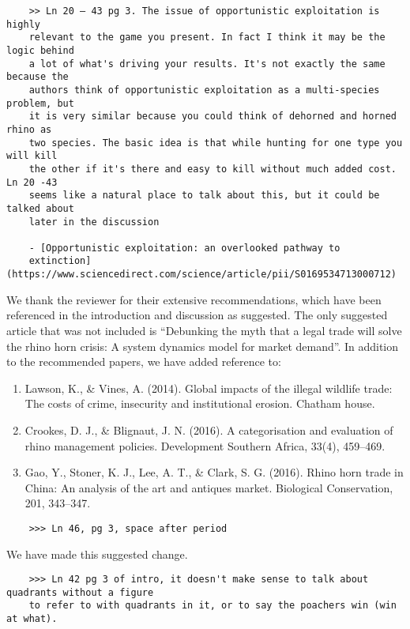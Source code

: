 \documentclass[10pt]{article}
\begin{document}
\begin{verbatim}
    >> Ln 20 – 43 pg 3. The issue of opportunistic exploitation is highly
    relevant to the game you present. In fact I think it may be the logic behind
    a lot of what's driving your results. It's not exactly the same because the
    authors think of opportunistic exploitation as a multi-species problem, but
    it is very similar because you could think of dehorned and horned rhino as
    two species. The basic idea is that while hunting for one type you will kill
    the other if it's there and easy to kill without much added cost.  Ln 20 -43
    seems like a natural place to talk about this, but it could be talked about
    later in the discussion

    - [Opportunistic exploitation: an overlooked pathway to
    extinction](https://www.sciencedirect.com/science/article/pii/S0169534713000712)
\end{verbatim}

We thank the reviewer for their extensive recommendations, which have been referenced
in the introduction and discussion as suggested. The only suggested article that was
not included is ``Debunking the myth that a legal trade will solve the rhino horn crisis:
A system dynamics model for market demand''. In addition to the recommended papers,
we have added reference to:

\begin{enumerate}
\item Lawson, K., \& Vines, A. (2014). Global impacts of the illegal wildlife trade: The costs of crime, insecurity and institutional erosion. Chatham house.

\item Crookes, D. J., \& Blignaut, J. N. (2016). A categorisation and evaluation of rhino management policies. Development Southern Africa, 33(4), 459--469.

\item Gao, Y., Stoner, K. J., Lee, A. T., \& Clark, S. G. (2016). Rhino horn trade in China: An analysis of the art and antiques market. Biological Conservation, 201, 343--347.
\end{enumerate}

\begin{verbatim}
    >>> Ln 46, pg 3, space after period
\end{verbatim}

We have made this suggested change.

\begin{verbatim}
    >>> Ln 42 pg 3 of intro, it doesn't make sense to talk about quadrants without a figure
    to refer to with quadrants in it, or to say the poachers win (win at what).
\end{verbatim}
\end{document}
